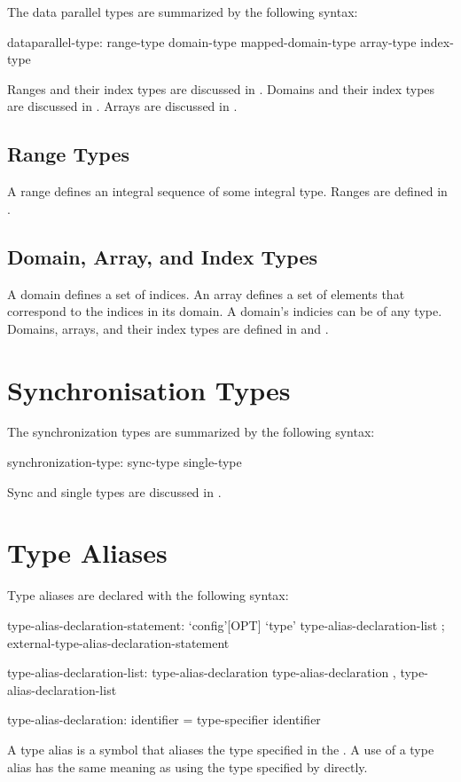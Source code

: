 The data parallel types are summarized by the following syntax:

\begin{syntax}
dataparallel-type:
  range-type
  domain-type
  mapped-domain-type
  array-type
  index-type
\end{syntax}

Ranges and their index types are discussed in .
Domains and their index types are discussed in .
Arrays are discussed in .

\subsection{Range Types}

A range defines an integral sequence of some integral type.  Ranges
are defined in .

\subsection{Domain, Array, and Index Types}
\label{Domain_and_Array_Types}

A domain defines a set of indices. An array defines a set of
elements that correspond to the indices in its domain.
A domain's indicies can be of any type.
Domains, arrays, and their index
types are defined in  and .

\section{Synchronisation Types}
\label{Synchronisation_Types}

The synchronization types are summarized by the following syntax:

\begin{syntax}
synchronization-type:
  sync-type
  single-type
\end{syntax}

Sync and single types are discussed in .

\section{Type Aliases}
\label{Type_Aliases}

Type aliases are declared with the following syntax:
\begin{syntax}
type-alias-declaration-statement:
  `config'[OPT] `type' type-alias-declaration-list ;
  external-type-alias-declaration-statement

type-alias-declaration-list:
  type-alias-declaration
  type-alias-declaration , type-alias-declaration-list

type-alias-declaration:
  identifier = type-specifier
  identifier
\end{syntax}
A type alias is a symbol that aliases the type specified in the
.  A use of a type alias has the same meaning as using
the type specified by  directly.

